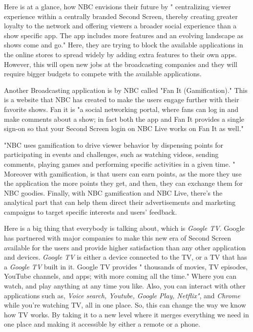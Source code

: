 \documentclass[12pt, oneside]{amsart}   	%
\begin{document}
Here is at a glance, how NBC envisions their future by " centralizing viewer experience within a centrally branded Second Screen, thereby creating greater loyalty to the network and offering viewers a broader social experience than a show specific app.  The app includes more features and an evolving landscape as shows come and go." \cite{Second-Screen-Art}  Here, they are trying to block the available applications in the online stores to spread widely by adding extra features to their own apps.  However, this will open new jobs at the broadcasting companies and they will require bigger budgets to compete with the available applications.

Another Broadcasting application is by NBC called "Fan It (Gamification)." This is a website that NBC has created to make the users engage further with their favorite shows.  Fan it is "a social networking portal, where fans can log in and make comments about a show; in fact both the app and Fan It provides a single sign-on so that your Second Screen login on NBC Live works on Fan It as well." \cite{Second-Screen-Art}

"NBC uses gamification to drive viewer behavior by dispensing points for participating in events and 
challenges, such as watching videos, sending comments, playing games and performing specific 
activities in a given time. "\cite{Second-Screen-Art}  Moreover with gamification, is that users can earn points, as the more they use the application the more points they get, and then, they can exchange them for NBC goodies.  Finally, with NBC gamification and NBC Live, there's the analytical part that can help them direct their advertisements and marketing campaigns to target specific interests and 
users' feedback.

Here is a big thing that everybody is talking about, which is  \emph{Google TV}.  Google has partnered with major companies to make this new era of Second Screen available for the users and provide higher satisfaction than any other application and devices.   \emph{Google TV} is either a device connected to the TV, or a TV that has a  \emph{Google TV} built in it.  Google TV provides " thousands of movies, TV episodes, YouTube channels, and apps; with more coming all the time."\cite{Google} Where you can watch, and play anything at any time you like.  Also, you can interact with other applications such as,  \emph{Voice search, Youtube, Google Play, Netflix"},  and  \emph{Chrome} while you're watching TV, all in one place.  So, this can change the way we know how TV works. By taking it to a new level where it merges everything we need in one place and making it accessible by either a remote or a phone.
\end{document}
